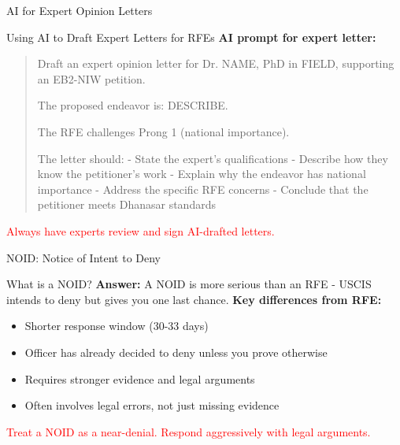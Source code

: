\documentclass[11pt]{beamer}
\begin{document}
	\begin{frame}{AI for Expert Opinion Letters}
		\scriptsize
		\begin{block}{Using AI to Draft Expert Letters for RFEs}
			\textbf{AI prompt for expert letter:}
			\begin{quote}
				Draft an expert opinion letter for Dr. NAME, PhD in FIELD, supporting an EB2-NIW petition.
				
				The proposed endeavor is: DESCRIBE.
				
				The RFE challenges Prong 1 (national importance).
				
				The letter should:
				- State the expert's qualifications
				- Describe how they know the petitioner's work
				- Explain why the endeavor has national importance
				- Address the specific RFE concerns
				- Conclude that the petitioner meets Dhanasar standards
			\end{quote}
			\textcolor{red}{Always have experts review and sign AI-drafted letters.}
		\end{block}
	\end{frame}
	
	
	\begin{frame}{NOID: Notice of Intent to Deny}
		\scriptsize
		\begin{block}{What is a NOID?}
			\textbf{Answer:} A NOID is more serious than an RFE - USCIS intends to deny but gives you one last chance.
			\vspace{0.2cm}
			\textbf{Key differences from RFE:}
			\begin{itemize}
				\item Shorter response window (30-33 days)
				\item Officer has already decided to deny unless you prove otherwise
				\item Requires stronger evidence and legal arguments
				\item Often involves legal errors, not just missing evidence
			\end{itemize}
			\textcolor{red}{Treat a NOID as a near-denial. Respond aggressively with legal arguments.}
		\end{block}
	\end{frame}
	
\end{document}
